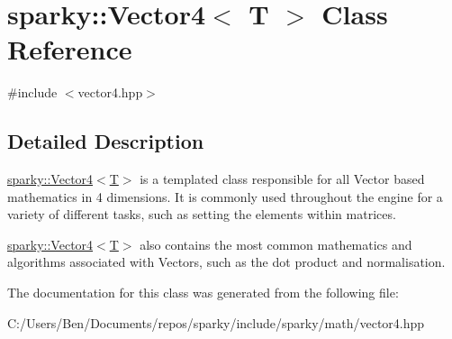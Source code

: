 \hypertarget{classsparky_1_1_vector4_3_01_t_01_4}{}\section{sparky\+:\+:Vector4$<$ T $>$ Class Reference}
\label{classsparky_1_1_vector4_3_01_t_01_4}


{\ttfamily \#include $<$vector4.\+hpp$>$}



\subsection{Detailed Description}
\hyperlink{classsparky_1_1_vector4_3_01_t_01_4}{sparky\+::\+Vector4$<$\+T$>$} is a templated class responsible for all Vector based mathematics in 4 dimensions. It is commonly used throughout the engine for a variety of different tasks, such as setting the elements within matrices.

\hyperlink{classsparky_1_1_vector4_3_01_t_01_4}{sparky\+::\+Vector4$<$\+T$>$} also contains the most common mathematics and algorithms associated with Vectors, such as the dot product and normalisation. 

The documentation for this class was generated from the following file\+:\begin{DoxyCompactItemize}
\item 
C\+:/\+Users/\+Ben/\+Documents/repos/sparky/include/sparky/math/vector4.\+hpp\end{DoxyCompactItemize}
